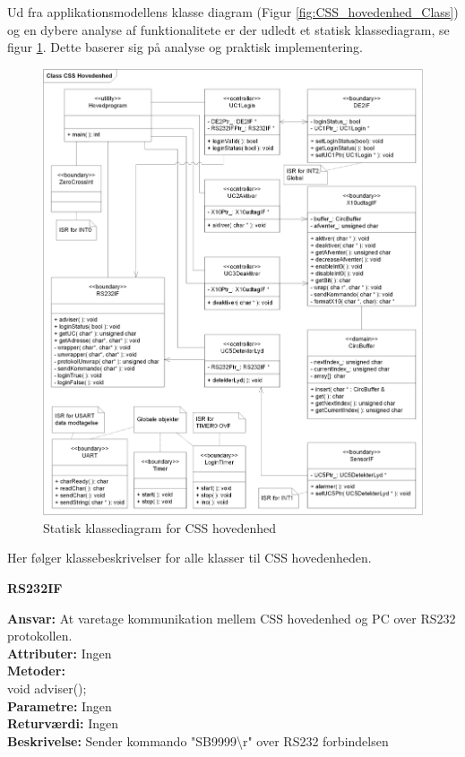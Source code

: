 Ud fra applikationsmodellens klasse diagram (Figur \ref{fig:CSS_hovedenhed_Class}) og en dybere analyse af funktionalitete er der udledt et statisk klassediagram, se figur \ref{fig:CSS_hovedenhed_Class_Static}. Dette baserer sig på analyse og praktisk implementering.

\begin{figure}[!htb] \centering
     \includegraphics[width=\textwidth]{billeder/uml/CSS_hovedenhed_Class_Static}
     \caption{Statisk klassediagram for CSS hovedenhed}
     \label{fig:CSS_hovedenhed_Class_Static}
\end{figure}
	
Her følger klassebeskrivelser for alle klasser til CSS hovedenheden. \\

%
%
{\centering
\textbf{RS232IF}\par
}
\textbf{Ansvar:} At varetage kommunikation mellem CSS hovedenhed og PC over RS232 protokollen. \\
\textbf{Attributer:} Ingen \\
\textbf{Metoder:} \\
void adviser(); \\
\textbf{Parametre:} Ingen \\
\textbf{Returværdi:} Ingen \\
\textbf{Beskrivelse:} Sender kommando "SB9999\textbackslash r" over RS232 forbindelsen \\

